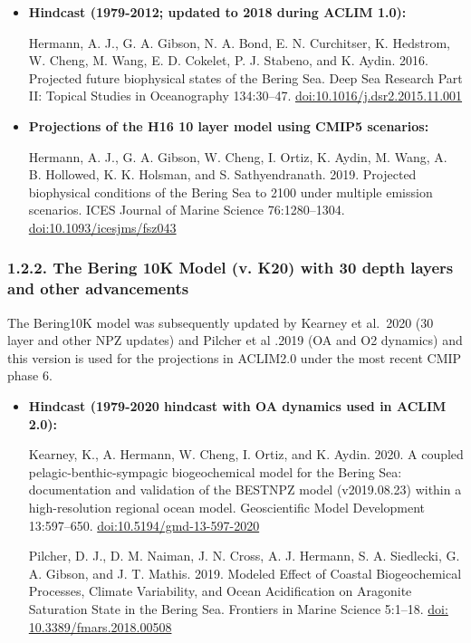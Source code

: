 \documentclass[
]{article}
\begin{document}
\begin{itemize}
\item
  \textbf{Hindcast (1979-2012; updated to 2018 during ACLIM 1.0):}

  Hermann, A. J., G. A. Gibson, N. A. Bond, E. N. Curchitser, K.
  Hedstrom, W. Cheng, M. Wang, E. D. Cokelet, P. J. Stabeno, and K.
  Aydin. 2016. Projected future biophysical states of the Bering Sea.
  Deep Sea Research Part II: Topical Studies in Oceanography 134:30--47.
  \href{http://dx.doi.org/10.1016/j.dsr2.2015.11.001}{doi:10.1016/j.dsr2.2015.11.001}
\item
  \textbf{Projections of the H16 10 layer model using CMIP5 scenarios:}

  Hermann, A. J., G. A. Gibson, W. Cheng, I. Ortiz, K. Aydin, M. Wang,
  A. B. Hollowed, K. K. Holsman, and S. Sathyendranath. 2019. Projected
  biophysical conditions of the Bering Sea to 2100 under multiple
  emission scenarios. ICES Journal of Marine Science 76:1280--1304.
  \href{https://academic.oup.com/icesjms/article/76/5/1280/5477847?login=true}{doi:10.1093/icesjms/fsz043}
\end{itemize}

\hypertarget{the-bering-10k-model-v.-k20-with-30-depth-layers-and-other-advancements}{%
\subsubsection{1.2.2. The Bering 10K Model (v. K20) with 30 depth layers
and other
advancements}\label{the-bering-10k-model-v.-k20-with-30-depth-layers-and-other-advancements}}

The Bering10K model was subsequently updated by Kearney et al.~2020 (30
layer and other NPZ updates) and Pilcher et al .2019 (OA and O2
dynamics) and this version is used for the projections in ACLIM2.0 under
the most recent CMIP phase 6.

\begin{itemize}
\item
  \textbf{Hindcast (1979-2020 hindcast with OA dynamics used in ACLIM
  2.0):}

  Kearney, K., A. Hermann, W. Cheng, I. Ortiz, and K. Aydin. 2020. A
  coupled pelagic-benthic-sympagic biogeochemical model for the Bering
  Sea: documentation and validation of the BESTNPZ model (v2019.08.23)
  within a high-resolution regional ocean model. Geoscientific Model
  Development 13:597--650.
  \href{https://doi.org/10.5194/gmd-13-597-2020}{doi:10.5194/gmd-13-597-2020}

  Pilcher, D. J., D. M. Naiman, J. N. Cross, A. J. Hermann, S. A.
  Siedlecki, G. A. Gibson, and J. T. Mathis. 2019. Modeled Effect of
  Coastal Biogeochemical Processes, Climate Variability, and Ocean
  Acidification on Aragonite Saturation State in the Bering Sea.
  Frontiers in Marine Science 5:1--18.
  \href{https://www.frontiersin.org/articles/10.3389/fmars.2018.00508/full}{doi:
  10.3389/fmars.2018.00508}
\end{itemize}
\end{document}
